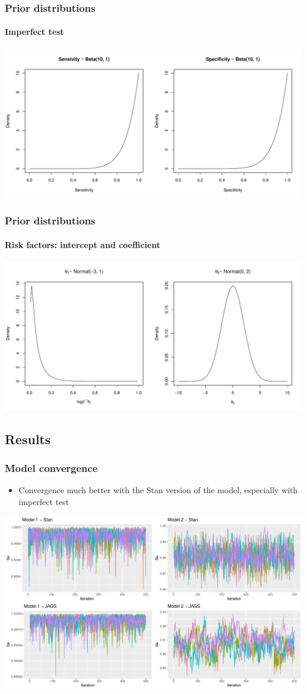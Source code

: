 \documentclass{beamer}
\begin{document}
\begin{frame}
\frametitle{Prior distributions}
\framesubtitle{Imperfect test}
\includegraphics[width=\textwidth]{imgs/priors_imperfect_test.pdf}
\end{frame}

\begin{frame}
\frametitle{Prior distributions}
\framesubtitle{Risk factors: intercept and coefficient}
\includegraphics[width=\textwidth]{imgs/priors_thetas.pdf}
\end{frame}

\subsection{Results}

\begin{frame}
\frametitle{Model convergence}
\begin{itemize}
 \item{Convergence much better with the Stan version of the model, especially with imperfect test}
\end{itemize}
\includegraphics[width=\textwidth]{imgs/traceplots.pdf}
\end{frame}
\end{document}
